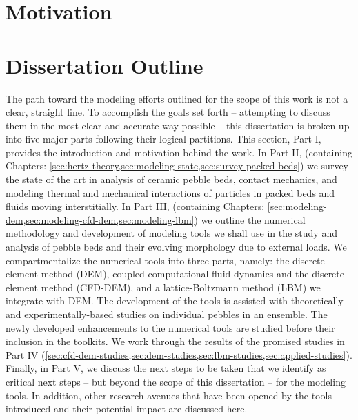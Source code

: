 \chapter{Motivation}\label{sec:motivation}




\chapter{Dissertation Outline}
The path toward the modeling efforts outlined for the scope of this work is not a clear, straight line. To accomplish the goals set forth -- attempting to discuss them in the most clear and accurate way possible -- this dissertation is broken up into five major parts following their logical partitions. This section, Part I, provides the introduction and motivation behind the work. In Part II, (containing Chapters: \cref{sec:hertz-theory,sec:modeling-state,sec:survey-packed-beds}) we survey the state of the art in analysis of ceramic pebble beds, contact mechanics, and modeling thermal and mechanical interactions of particles in packed beds and fluids moving interstitially.  In Part III, (containing Chapters: \cref{sec:modeling-dem,sec:modeling-cfd-dem,sec:modeling-lbm}) we outline the numerical methodology and development of modeling tools we shall use in the study and analysis of pebble beds and their evolving morphology due to external loads. We compartmentalize the numerical tools into three parts, namely: the discrete element method (DEM), coupled computational fluid dynamics and the discrete element method (CFD-DEM), and a lattice-Boltzmann method (LBM) we integrate with DEM. The development of the tools is assisted with theoretically- and experimentally-based studies on individual pebbles in an ensemble. The newly developed enhancements to the numerical tools are studied before their inclusion in the toolkits. We work through the results of the promised studies in Part IV (\cref{sec:cfd-dem-studies,sec:dem-studies,sec:lbm-studies,sec:applied-studies}). Finally, in Part V, we discuss the next steps to be taken that we identify as critical next steps -- but beyond the scope of this dissertation -- for the modeling tools. In addition, other research avenues that have been opened by the tools introduced and their potential impact are discussed here.